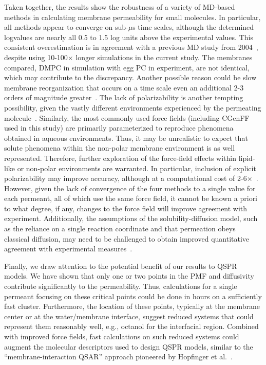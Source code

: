 Taken together, the results show the robustness of a variety of MD-based methods in calculating membrane permeability for small molecules.  In particular, all methods appear to converge on sub-$\mu$s time scales, although the determined log\perm values are nearly all 0.5 to 1.5 log units above the experimental values.  This consistent overestimation is in agreement with a previous MD study from 2004~\cite{Bemporad2004}, despite using 10-100$\times$ longer simulations in the current study.  The membranes compared, DMPC in simulation with egg PC in experiment, are not identical, which may contribute to the discrepancy.  Another possible reason could be slow membrane reorganization that occurs on a time scale even an additional 2-3 orders of magnitude greater~\cite{Neale2011}.  The lack of polarizability is another tempting possibility, given the vastly different environments experienced by the permeating molecule~\cite{Riahi2014}.
Similarly, the most commonly used force fields (including CGenFF used in this study) are primarily parameterized to reproduce phenomena obtained in aqueous environments. Thus, it may be unrealistic to expect that solute phenomena within the non-polar membrane environment is as well represented. Therefore, further exploration of the force-field effects within lipid-like or non-polar environments are warranted.  In particular, inclusion of explicit polarizability may improve accuracy, although at a computational cost of 2-6$\times$~\cite{Chowdhary2013,Wang2013}. However, given the lack of convergence of the four methods to a single value for each permeant, all of which use the same force field, it cannot be known a priori to what degree, if any, changes to the force field will improve agreement with experiment.
Additionally, the assumptions of the solubility-diffusion model, such as the reliance on a single reaction coordinate and that permeation obeys classical diffusion, may need to be challenged to obtain improved quantitative agreement with experimental measures~\cite{Orsi2010,Parisio2013,Comer2014}.

Finally, we draw attention to the potential benefit of our results to QSPR models.
We have shown that only one or two points in the PMF and diffusivity contribute significantly to the permeability.  Thus, calculations for a single permeant focusing on these critical points could be done in hours on a sufficiently fast cluster.  Furthermore, the location of these points, typically at the membrane center or at the water/membrane interface, suggest reduced systems that could represent them reasonably well, e.g., octanol for the interfacial region.
Combined with improved force fields, fast calculations on such reduced systems could augment the molecular descriptors used to design QSPR models, similar to the ``membrane-interaction QSAR'' approach pioneered by Hopfinger et al.~\cite{Kulkarni1999,Tseng2012}.

